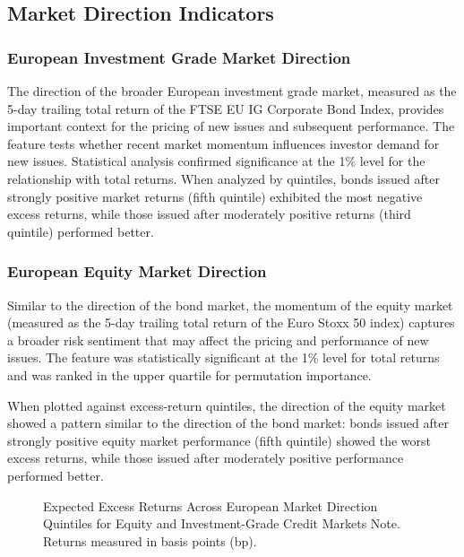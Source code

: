 \subsection{Market Direction Indicators}
\subsubsection{European Investment Grade Market Direction}
The direction of the broader European investment grade market, measured as the 5-day trailing total return of the FTSE EU IG Corporate Bond Index, provides important context for the pricing of new issues and subsequent performance. The feature tests whether recent market momentum influences investor demand for new issues. Statistical analysis confirmed significance at the 1\% level for the relationship with total returns. When analyzed by quintiles, bonds issued after strongly positive market returns (fifth quintile) exhibited the most negative excess returns, while those issued after moderately positive returns (third quintile) performed better.

\subsubsection{European Equity Market Direction}
Similar to the direction of the bond market, the momentum of the equity market (measured as the 5-day trailing total return of the Euro Stoxx 50 index) captures a broader risk sentiment that may affect the pricing and performance of new issues. The feature was statistically significant at the 1\% level for total returns and was ranked in the upper quartile for permutation importance.

When plotted against excess-return quintiles, the direction of the equity market showed a pattern similar to the direction of the bond market: bonds issued after strongly positive equity market performance (fifth quintile) showed the worst excess returns, while those issued after moderately positive performance performed better.

\begin{figure}[h]
    \begin{center}
        
    \end{center}
    \caption{Expected Excess Returns Across European Market Direction Quintiles for Equity and Investment-Grade Credit Markets Note. Returns measured in basis points (bp).}
    \label{fig:eu_direction}
\end{figure}

